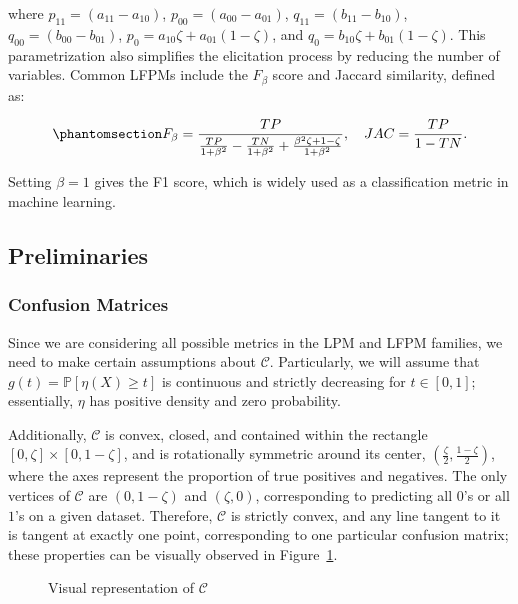\documentclass[
  letterpaper,
  numbers=noenddot,
  DIV=11]{scrreprt}
\theoremstyle{definition}
\theoremstyle{plain}
\theoremstyle{plain}
\theoremstyle{remark}
\begin{document}
where \(p_{11} = (a_{11} - a_{10})\), \(p_{00} = (a_{00} - a_{01})\),
\(q_{11} = (b_{11} - b_{10})\), \(q_{00} = (b_{00} - b_{01})\),
\(p_{0} = a_{10} \zeta + a_{01} (1 - \zeta)\), and
\(q_{0} = b_{10} \zeta + b_{01} (1 - \zeta)\). This parametrization also
simplifies the elicitation process by reducing the number of variables.
Common LFPMs include the \(F_\beta\) score and Jaccard similarity,
defined as:

\begin{equation}\phantomsection\label{eq-lfpm_metrics}{F_{\beta} = \frac{TP}{\frac{TP}{1+\beta^{2}} - \frac{TN}{1+\beta^{2}} + \frac{\beta^{2} \zeta + 1 - \zeta}{1+\beta^{2}}}, \quad JAC = \frac{TP}{1 - TN}.}\end{equation}

Setting \(\beta = 1\) gives the F1 score, which is widely used as a
classification metric in machine learning.

\subsection{Preliminaries}\label{sec-me-preliminaries}

\subsubsection*{Confusion Matrices}\label{sec-confusion-matrices}

Since we are considering all possible metrics in the LPM and LFPM
families, we need to make certain assumptions about \(\mathcal{C}\).
Particularly, we will assume that \(g(t) = \mathbb{P}[\eta(X) \geq t]\)
is continuous and strictly decreasing for \(t \in [0, 1]\); essentially,
\(\eta\) has positive density and zero probability.

Additionally, \(\mathcal{C}\) is convex, closed, and contained within
the rectangle \([0, \zeta] \times [0, 1-\zeta]\), and is rotationally
symmetric around its center, \((\frac{\zeta}{2}, \frac{1-\zeta}{2})\),
where the axes represent the proportion of true positives and negatives.
The only vertices of \(\mathcal{C}\) are \((0, 1-\zeta)\) and
\((\zeta, 0)\), corresponding to predicting all \(0\)'s or all \(1\)'s
on a given dataset. Therefore, \(\mathcal{C}\) is strictly convex, and
any line tangent to it is tangent at exactly one point, corresponding to
one particular confusion matrix; these properties can be visually
observed in Figure~\ref{fig-c}.

\begin{figure}


\caption{\label{fig-c}Visual representation of \(\mathcal{C}\)}

\end{figure}%
\end{document}
